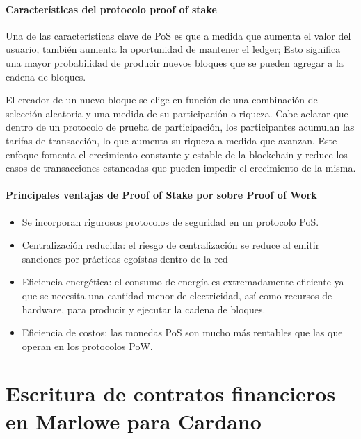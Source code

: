 \documentclass[12pt]{book}
\begin{document}
\subsubsection{Características del protocolo proof of stake}

Una de las características clave de PoS es que a medida que aumenta el valor del usuario, también aumenta la oportunidad de mantener el ledger; Esto significa una mayor probabilidad de producir nuevos bloques que se pueden agregar a la cadena de bloques.

El creador de un nuevo bloque se elige en función de una combinación de selección aleatoria y una medida de su participación o riqueza. Cabe aclarar que dentro de un protocolo de prueba de participación, los participantes acumulan las tarifas de transacción, lo que aumenta su riqueza a medida que avanzan. Este enfoque fomenta el crecimiento constante y estable de la blockchain y reduce los casos de transacciones estancadas que pueden impedir el crecimiento de la misma.

\subsubsection{Principales ventajas de Proof of Stake por sobre Proof of Work}

\begin{itemize}
	\item Se incorporan rigurosos protocolos de seguridad en un protocolo PoS.
	\item Centralización reducida: el riesgo de centralización se reduce al emitir sanciones por prácticas egoístas dentro de la red
	\item Eficiencia energética: el consumo de energía es extremadamente eficiente ya que se necesita una cantidad menor de electricidad, así como recursos de hardware, para producir y ejecutar la cadena de bloques.
	\item Eficiencia de costos: las monedas PoS son mucho más rentables que las que operan en los protocolos PoW.
\end{itemize}






\chapter[Escritura de contratos financieros en
  Marlowe]{Escritura de contratos financieros en Marlowe para Cardano}
\end{document}
